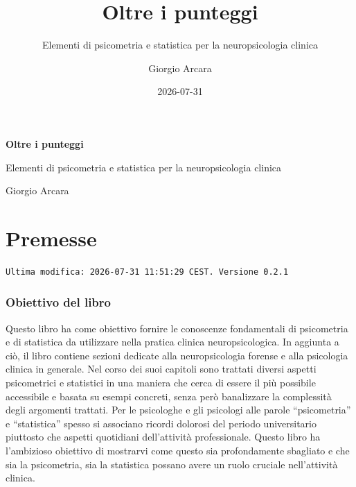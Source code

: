 \documentclass[
  italian,
  letterpaper,
  paper=6in:9in,
  pagesize=pdftex,
  headinclude=on,
  footinclude=on,
  11pt]{scrbook}
\title{Oltre i punteggi}
\subtitle{Elementi di psicometria e statistica per la neuropsicologia
clinica}
\author{Giorgio Arcara}
\date{2026-07-31}
\renewcommand{\maketitle}{}
\renewcommand*\contentsname{Indice}
\newcommand\contentsname{Indice}
\begin{document}
\frontmatter
\maketitle

\begin{titlepage}
\centering
\vspace*{4cm}
{\Huge\bfseries Oltre i punteggi\par}
\vspace{1cm}
{\Large Elementi di psicometria e statistica per la neuropsicologia clinica\par}
\vspace{2cm}
{\large Giorgio Arcara\par}
\end{titlepage}

\renewcommand*\contentsname{Indice}
{
\setcounter{tocdepth}{2}
\tableofcontents
}

\mainmatter
{}

\chapter*{Premesse}\label{premesse}


\begin{verbatim}
Ultima modifica: 2026-07-31 11:51:29 CEST. Versione 0.2.1
\end{verbatim}

\subsection*{Obiettivo del libro}\label{obiettivo-del-libro}

Questo libro ha come obiettivo fornire le conoscenze fondamentali di
psicometria e di statistica da utilizzare nella pratica clinica
neuropsicologica. In aggiunta a ciò, il libro contiene sezioni dedicate
alla neuropsicologia forense e alla psicologia clinica in generale. Nel
corso dei suoi capitoli sono trattati diversi aspetti psicometrici e
statistici in una maniera che cerca di essere il più possibile
accessibile e basata su esempi concreti, senza però banalizzare la
complessità degli argomenti trattati. Per le psicologhe e gli psicologi
alle parole ``psicometria'' e ``statistica'' spesso si associano ricordi
dolorosi del periodo universitario piuttosto che aspetti quotidiani
dell'attività professionale. Questo libro ha l'ambizioso obiettivo di
mostrarvi come questo sia profondamente sbagliato e che sia la
psicometria, sia la statistica possano avere un ruolo cruciale
nell'attività clinica.
\end{document}
